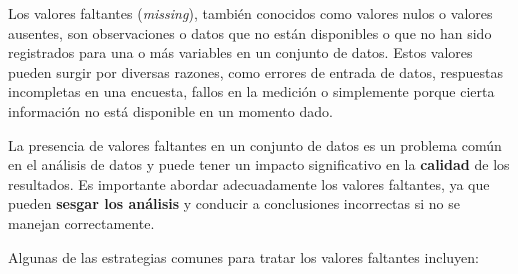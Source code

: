 \documentclass[
  letterpaper,
  DIV=11,
  numbers=noendperiod]{scrreprt}
\begin{document}
Los valores faltantes (\emph{missing}), también conocidos como valores
nulos o valores ausentes, son observaciones o datos que no están
disponibles o que no han sido registrados para una o más variables en un
conjunto de datos. Estos valores pueden surgir por diversas razones,
como errores de entrada de datos, respuestas incompletas en una
encuesta, fallos en la medición o simplemente porque cierta información
no está disponible en un momento dado.

\begin{tcolorbox}[enhanced jigsaw, arc=.35mm, breakable, coltitle=black, left=2mm, opacityback=0, bottomtitle=1mm, colbacktitle=quarto-callout-important-color!10!white, title=\textcolor{quarto-callout-important-color}{\faExclamation}\hspace{0.5em}{Para recordar}, titlerule=0mm, colback=white, colframe=quarto-callout-important-color-frame, bottomrule=.15mm, rightrule=.15mm, opacitybacktitle=0.6, toptitle=1mm, toprule=.15mm, leftrule=.75mm]

La presencia de valores faltantes en un conjunto de datos es un problema
común en el análisis de datos y puede tener un impacto significativo en
la \textbf{calidad} de los resultados. Es importante abordar
adecuadamente los valores faltantes, ya que pueden \textbf{sesgar los
análisis} y conducir a conclusiones incorrectas si no se manejan
correctamente.

\end{tcolorbox}

Algunas de las estrategias comunes para tratar los valores faltantes
incluyen:
\end{document}
